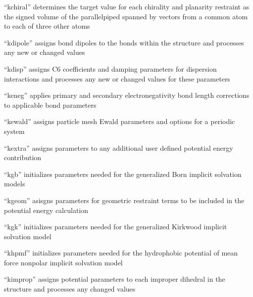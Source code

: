\documentclass[letterpaper,11pt,english]{sphinxmanual}
\begin{document}

“kchiral” determines the target value for each chirality
and planarity restraint as the signed volume of the
parallelpiped spanned by vectors from a common atom to
each of three other atoms


“kdipole” assigns bond dipoles to the bonds within
the structure and processes any new or changed values


“kdisp” assigns C6 coefficients and damping parameters for
dispersion interactions and processes any new or changed
values for these parameters


“keneg” applies primary and secondary electronegativity bond
length corrections to applicable bond parameters


“kewald” assigns particle mesh Ewald parameters and options
for a periodic system


“kextra” assigns parameters to any additional user defined
potential energy contribution


“kgb” initializes parameters needed for the generalized
Born implicit solvation models


“kgeom” asisgns parameters for geometric restraint terms
to be included in the potential energy calculation


“kgk” initializes parameters needed for the generalized
Kirkwood implicit solvation model


“khpmf” initializes parameters needed for the hydrophobic
potential of mean force nonpolar implicit solvation model


“kimprop” assigns potential parameters to each improper
dihedral in the structure and processes any changed values

\end{document}
